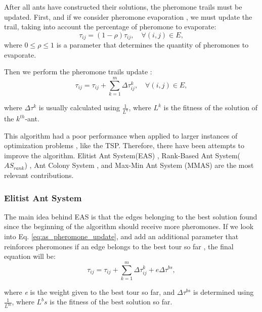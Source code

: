 					After all ants have constructed their solutions, the pheromone trails must be updated. First, and if we consider pheromone evaporation \cite{dorigo96}, we must update the trail, taking into account the percentage of pheromone to evaporate:
					\begin{equation}
						\tau_{ij} = (1 - \rho)\tau_{ij}, \quad \forall(i,j)\in E,
					\end{equation}
		\noindent where $0 \leq \rho \leq 1$ is a parameter that determines the quantity of pheromones to evaporate.

					Then we perform the  pheromone trails update \cite{dorigo96}:
					\begin{equation}
						\label{eq:as_pheromone_update}
						\tau_{ij} = \tau_{ij} + \sum_{k=1}^{m}\Delta\tau_{ij}^k, \quad \forall(i,j)\in E,
					\end{equation}


		\noindent where $\Delta\tau^k$ is usually calculated using $\frac{1} {L^k}$, where $L^k$ is the fitness of the solution of the $k^{th}$-ant.

					This algorithm had a poor performance when applied to larger instances of optimization problems \cite{acobook}, like the TSP. Therefore, there have been attempts to improve the algorithm. Elitist Ant System(EAS) \cite{dorigo92, dorigo96}, Rank-Based Ant System($AS_{rank}$) \cite{bullnheimer97}, Ant Colony System \cite{dorigo97}, and Max-Min Ant System (MMAS) \cite{stutzle00} are the most relevant contributions.

					\subsubsection*{Elitist Ant System}

					The main idea behind EAS \cite{dorigo92, dorigo96} is that the edges belonging to the best solution found since the beginning of the algorithm should receive more pheromones. If we look into Eq. \eqref{eq:as_pheromone_update}, and add an additional parameter that reinforces pheromones if an edge belongs to the best tour so far \cite{dorigo92, dorigo96}, the final equation will be:
					\begin{equation}
						\label{eq:eas_pheromone_update}
						\tau_{ij} = \tau_{ij} + \sum_{k=1}^{m}\Delta\tau_{ij}^k + e\Delta\tau^{bs},
					\end{equation}

		\noindent where \emph{e} is the weight given to the best tour so far, and $\Delta\tau^{bs}$ is determined using $\frac{1} {L^{bs}}$, where ${L^bs}$ is the fitness of the best solution so far. 


